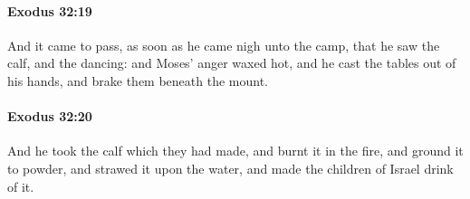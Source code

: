 		\paragraph{Exodus 32:19} %
			\label{EXODUS-32-19}

			And it came to pass, as soon as he came nigh unto the camp, that he saw the calf, and the dancing: and Moses' anger waxed hot, and he cast the tables out of his hands, and brake them beneath the mount.


		\paragraph{Exodus 32:20} %
			\label{EXODUS-32-20}

			And he took the calf which they had made, and burnt it in the fire, and ground it to powder, and strawed it upon the water, and made the children of Israel drink of it.


